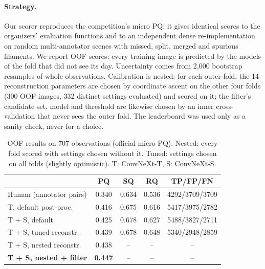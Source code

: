 \paragraph{Strategy.}
Our scorer reproduces the competition's micro PQ: it gives identical
scores to the organizers' evaluation functions and to an independent dense
re-implementation on random multi-annotator scenes with missed, split,
merged and spurious filaments. We report OOF scores: every
training image is predicted by the models of the fold that did not see its
day. Uncertainty comes from 2{,}000 bootstrap resamples of whole
observations. Calibration is nested: for each outer fold, the 14
reconstruction parameters are chosen by coordinate ascent on the other four
folds (300 OOF images, 332 distinct settings evaluated) and scored on it;
the filter's candidate set, model and threshold are likewise chosen by an
inner cross-validation that never sees the outer fold. The leaderboard was
used only as a sanity check, never for a choice.

\begin{table}[t]
  \caption{OOF results on 707 observations (official micro PQ). Nested:
  every fold scored with settings chosen without it. Tuned: settings chosen
  on all folds (slightly optimistic). T: ConvNeXt-T, S: ConvNeXt-S.}
  \label{tab:main}
  \small
  \setlength{\tabcolsep}{2.5pt}
  \begin{tabular}{lcccc}
    \toprule
    & PQ & SQ & RQ & TP/FP/FN \\
    \midrule
    Human (annotator pairs) & 0.340 & 0.634 & 0.536 & 4292/3709/3709 \\
    T, default post-proc. & 0.416 & 0.675 & 0.616 & 5417/3975/2782 \\
    T + S, default & 0.425 & 0.678 & 0.627 & 5488/3827/2711 \\
    T + S, tuned reconstr. & 0.439 & 0.678 & 0.648 & 5340/2948/2859 \\
    T + S, nested reconstr. & 0.438 & -- & -- & -- \\
    \textbf{T + S, nested + filter} & \textbf{0.447} & -- & -- & -- \\
    \bottomrule
  \end{tabular}
\end{table}

